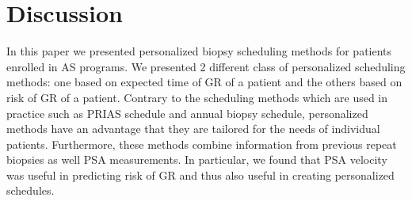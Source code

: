 
\section{Discussion}
\label{sec: discussion}

In this paper we presented personalized biopsy scheduling methods for patients enrolled in AS programs. We presented 2 different class of personalized scheduling methods: one based on expected time of GR of a patient and the others based on risk of GR of a patient. Contrary to the scheduling methods which are used in practice such as PRIAS schedule and annual biopsy schedule, personalized methods have an advantage that they are tailored for the needs of individual patients. Furthermore, these methods combine information from previous repeat biopsies as well PSA measurements. In particular, we found that PSA velocity was useful in predicting risk of GR and thus also useful in creating personalized schedules.